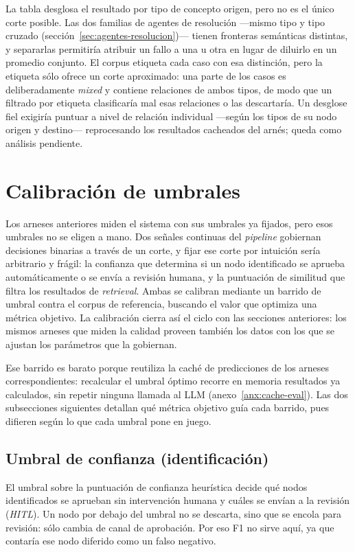 La tabla desglosa el resultado por tipo de concepto origen, pero no es el único corte posible. Las
dos familias de agentes de resolución —mismo tipo y tipo cruzado (sección~\ref{sec:agentes-resolucion})—
tienen fronteras semánticas distintas, y separarlas permitiría atribuir un fallo a una u otra en
lugar de diluirlo en un promedio conjunto. El corpus etiqueta cada caso con esa distinción, pero la
etiqueta sólo ofrece un corte aproximado: una parte de los casos es deliberadamente \textit{mixed} y
contiene relaciones de ambos tipos, de modo que un filtrado por etiqueta clasificaría mal esas
relaciones o las descartaría. Un desglose fiel exigiría puntuar a nivel de relación individual
—según los tipos de su nodo origen y destino— reprocesando los resultados cacheados del arnés; queda
como análisis pendiente.

\section{Calibración de umbrales}

Los arneses anteriores miden el sistema con sus umbrales ya fijados, pero esos umbrales no se
eligen a mano. Dos señales continuas del \textit{pipeline} gobiernan decisiones binarias a través
de un corte, y fijar ese corte por intuición sería arbitrario y frágil: la confianza que determina
si un nodo identificado se aprueba automáticamente o se envía a revisión humana, y la puntuación de
similitud que filtra los resultados de \textit{retrieval}. Ambas se calibran mediante un barrido de
umbral contra el corpus de referencia, buscando el valor que optimiza una métrica objetivo. La
calibración cierra así el ciclo con las secciones anteriores: los mismos arneses que miden la
calidad proveen también los datos con los que se ajustan los parámetros que la gobiernan.

Ese barrido es barato porque reutiliza la caché de predicciones de los arneses correspondientes:
recalcular el umbral óptimo recorre en memoria resultados ya calculados, sin repetir ninguna llamada
al LLM (anexo~\ref{anx:cache-eval}). Las dos subsecciones siguientes detallan qué métrica objetivo
guía cada barrido, pues difieren según lo que cada umbral pone en juego.

\subsection{Umbral de confianza (identificación)}

El umbral sobre la puntuación de confianza heurística decide qué nodos identificados se aprueban
sin intervención humana y cuáles se envían a la revisión (\textit{HITL}). Un nodo por debajo del
umbral no se descarta, sino que se encola para revisión: sólo cambia de canal de aprobación. Por eso
F1 no sirve aquí, ya que contaría ese nodo diferido como un falso negativo.

